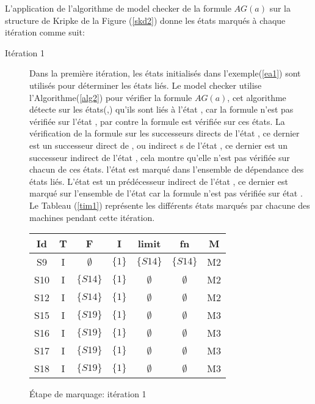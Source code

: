 \begin{Exemple}\label{ea2}
	L'application de l'algorithme de model checker de la formule \textit{$AG(a)$} sur la structure de Kripke de la Figure (\ref{skd2}) donne les états marqués à chaque itération comme suit:
\begin{description}
	\item[Itération 1] Dans la première itération, les états initialisés dans l'exemple(\ref{ea1}) sont utilisés pour déterminer les états liés. Le model checker utilise l'Algorithme(\ref{alg2}) pour vérifier la formule \textit{$AG(a)$}, cet algorithme détecte sur les états(,) qu'ils sont liés à l'état , car la formule n'est pas vérifiée sur l'état , par contre la formule est vérifiée sur ces états. La vérification de la formule sur les successeurs directs de l'état , ce dernier est un successeur direct de , ou indirect	s de l'état , ce dernier est un successeur indirect de l'état , cela montre qu'elle n'est pas vérifiée sur chacun de ces états. l'état  est marqué dans l'ensemble de dépendance des états liés. L'état  est un prédécesseur indirect de l'état , ce dernier est marqué sur l'ensemble  de l'état  car la formule n'est pas vérifiée sur état . Le Tableau (\ref{tim1}) représente les différents états marqués par chacune des machines pendant cette itération.   
\begin{tableth}
	\centering
	\begin{tabular}{|*{7}{c|}}
		\hline
		Id&		T&			F&	I&	limit&	fn&		M\\
		\hline
		S9&		I&$\emptyset$&$\{	1\}$&	$\{S14\}$&	$\{S14\}$&	M2\\
		\hline
		S10&	I&	$\{S14\}$&$\{	1\}$&$\emptyset$& $\emptyset$ &M2\\
		\hline
		S12&	I&	$\{S14\}$&$\{	1\}$&$\emptyset$&$\emptyset$ &	M2\\
		\hline
		S15&	I&	$\{S19\}$&$\{	1\}$&$\emptyset$&$\emptyset$ &	M3\\
		\hline
		S16&	I&	$\{S19\}$&$\{	1\}$&$\emptyset$&$\emptyset$ &	M3\\
		\hline
		S17&	I&	$\{S19\}$&$\{	1\}$&$\emptyset$&$\emptyset$ &	M3\\
		\hline
		S18&	I&	$\{S19\}$&$\{	1\}$&$\emptyset$&$\emptyset$ &	M3\\		
		\hline
	\end{tabular}
	\caption{Étape de marquage: itération 1}\label{tim1}
\end{tableth}
\\\\	

\end{description}
\end{Exemple}
